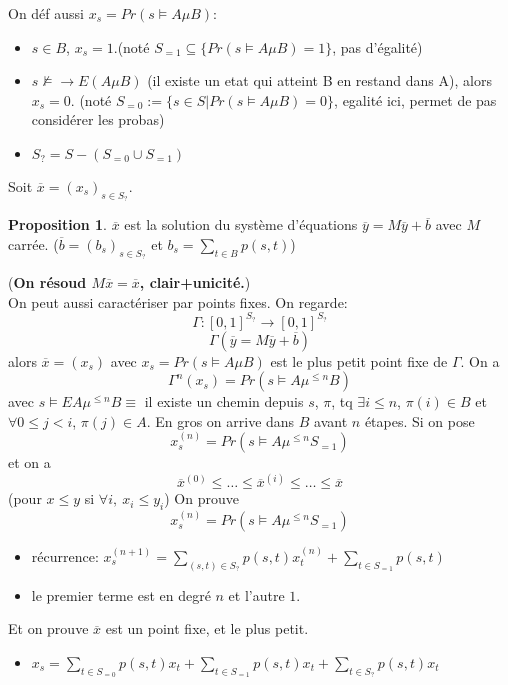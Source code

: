 \documentclass[12pt]{article}
\theoremstyle{plain}
\theoremstyle{definition}
\newtheorem{prop}[subsubsection]{Proposition}
\theoremstyle{remark}
\begin{document}
\noindent On déf aussi $x_s=Pr(s\vDash A\mu B)$:
\begin{itemize}
    \item $s\in B$, $x_s=1$.(noté $S_{=1}\subseteq \{Pr(s\vDash A\mu B)=1\}$, pas d'égalité)
    \item $s\nvDash \to E(A\mu B)$ (il existe un etat qui atteint B en restand dans A),
     alors $x_s=0$. (noté $S_{=0}:=\{s\in S| Pr(s\vDash A\mu B)=0\}$, egalité ici, permet de pas considérer
     les probas)
    \item $S_?=S-(S_{=0}\cup S_{=1})$
\end{itemize}
Soit $\overline{x}=(x_s)_{s\in S_?}$.
\begin{prop}
    $\overline{x}$ est la solution du système d'équations $\overline{y}=M\overline{y}+\overline{b}$
    avec $M$ carrée. ($\overline{b}=(b_s)_{s\in S_?}$ et $b_s=\sum_{t\in B} p(s,t)$)
\end{prop}
(\textbf{On résoud $M\overline{x}=\overline{x}$, clair+unicité.}) \\

On peut aussi caractériser par points fixes. On regarde: 
\[
    \Gamma: [0,1]^{S_?}\to[0,1]^{S_?}
\]
\[
    \Gamma(\overline{y}=M\overline{y}+\overline{b})   
\]
alors $\overline{x}=(x_s)$ avec $x_s=Pr(s\vDash A\mu B)$ est 
le plus petit point fixe de $\Gamma$. On a 
\[
    \Gamma^{n}(x_s)=Pr(s\vDash A\mu^{\leq n}B)
\]
avec $s\vDash EA\mu^{\leq n}B\equiv$ il existe un chemin depuis $s$, $\pi$, tq 
$\exists i\leq n$, $\pi(i)\in B$ et $\forall0\leq j<i$, $\pi(j)\in A$. En gros 
on arrive dans $B$ avant $n$ étapes. Si on pose 
\[
    x_s^{(n)}=Pr(s\vDash A\mu^{\leq n}S_{=1})   
\]
et on a 
\[
    \overline{x}^{(0)}\leq\ldots\leq\overline{x}^{(i)}\leq\ldots\leq \overline{x}
\]
(pour $x\leq y$ si $\forall i,~x_i\leq y_i$)
On prouve 
\[
    x_s^{(n)}=Pr(s\vDash A\mu^{\leq n}S_{=1})   
\]
\begin{itemize}
    \item récurrence: $x_s^{(n+1)}=\sum_{(s,t)\in S_?} p(s,t)x_t^{(n)}+\sum_{t\in S_{=1}} p(s,t)$
    \item le premier terme est en degré $n$ et l'autre $1$.
\end{itemize}
Et on prouve $\overline{x}$ est un point fixe, et le plus petit. 
\begin{itemize}
    \item $x_s=\sum_{t\in S_{=0}} p(s,t)x_t+\sum_{t\in S_{=1}}p(s,t)x_t+\sum_{t\in S_?}p(s,t)x_t$
\end{itemize}
\end{document}
